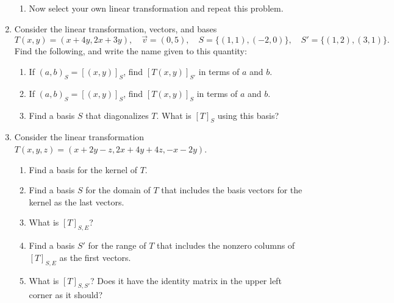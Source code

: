 \begin{enumerate}
\begin{enumerate}
\item Now select your own linear transformation and repeat this problem. 

\end{enumerate}


\item Consider the linear transformation, vectors, and bases 
$$T(x,y) = (x+4y, 2x+3y),\quad \vec v = (0,5),\quad S=\{(1,1),(-2,0)\},\quad S'=\{(1,2),(3,1)\}.$$  Find the following, and write the name given to this quantity:
\begin{enumerate}
	\item If $(a,b)_S = [(x,y)]_S$, find $[T(x,y)]_{S'}$ in terms of $a$ and $b$.
	\item If $(a,b)_S = [(x,y)]_S$, find $[T(x,y)]_{S}$ in terms of $a$ and $b$.
	\item Find a basis $S$ that diagonalizes $T$.  What is $[T]_S$ using this basis?
\end{enumerate}

\item Consider the linear transformation
$T(x,y,z) = (x+2y-z, 2x+4y+4z,-x-2y)$.
\begin{enumerate}
	\item Find a basis for the kernel of $T$.
	\item Find a basis $S$ for the domain of $T$ that includes the basis vectors for the kernel as the last vectors.
	\item What is $[T]_{S,E}$?
	\item Find a basis $S'$ for the range of $T$ that includes the nonzero columns of $[T]_{S,E}$ as the first vectors.
	\item What is $[T]_{S,S'}$? Does it have the identity matrix in the upper left corner as it should?
\end{enumerate}


\end{enumerate}
